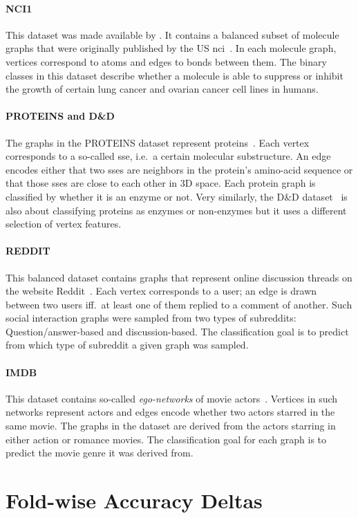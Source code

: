 \paragraph{NCI1}
This dataset was made available by \citet{Shervashidze2011}.
It contains a balanced subset of molecule graphs that were originally published by the US \ac{nci}~\cite{Wale2007}.
In each molecule graph, vertices correspond to atoms and edges to bonds between them.
The binary classes in this dataset describe whether a molecule is able to suppress or inhibit the growth of certain lung cancer and ovarian cancer cell lines in humans.

\paragraph{PROTEINS and D\&D}
The graphs in the PROTEINS dataset represent proteins~\cite{Borgwardt2005a}.
Each vertex corresponds to a so-called \ac{sse}, i.e.\ a certain molecular substructure.
An edge encodes either that two \acp{sse} are neighbors in the protein's amino-acid sequence or that those \acp{sse} are close to each other in 3D space.
Each protein graph is classified by whether it is an enzyme or not.
Very similarly, the D\&D dataset~\cite{Dobson2003} is also about classifying proteins as enzymes or non-enzymes but it uses a different selection of vertex features.

\paragraph{REDDIT}
This balanced dataset contains graphs that represent online discussion threads on the website Reddit~\cite{Yanardag2015}.
Each vertex corresponds to a user; an edge is drawn between two users iff.\ at least one of them replied to a comment of another.
Such social interaction graphs were sampled from two types of subreddits:
Question/answer-based and discussion-based.
The classification goal is to predict from which type of subreddit a given graph was sampled.

\paragraph{IMDB}
This dataset contains so-called \textit{ego-networks} of movie actors~\cite{Yanardag2015}.
Vertices in such networks represent actors and edges encode whether two actors starred in the same movie.
The graphs in the dataset are derived from the actors starring in either action or romance movies.
The classification goal for each graph is to predict the movie genre it was derived from.

\section{Fold-wise Accuracy Deltas}%
\label{sec:appendix:fold-diffs}
